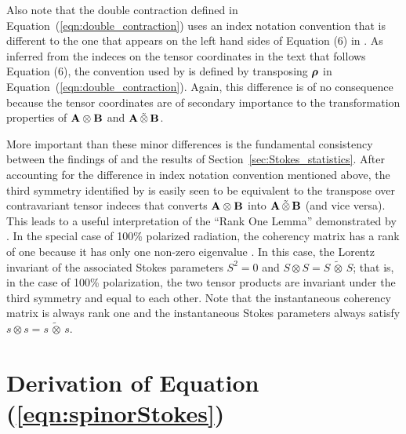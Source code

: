\documentclass[twocolumn]{aastex6}
\newcommand{\mbf}[1]{\mbox{\boldmath $#1$}}
\newcommand{\Eqn}[1]{Equation~(\ref{eqn:#1})}
\newcommand{\Sec}[1]{Section~\ref{sec:#1}}
\newcommand{\outerBilinear}[2]{\ensuremath{{#1}\otimes{#2}}}
\newcommand{\stimes}{\ensuremath{\tilde{\otimes}}}
\newcommand{\spinorBilinear}[2]{\ensuremath{{#1}\,\stimes\,{#2}}}
\begin{document}
{\begin{appendix}
Also note that the double contraction defined in
\Eqn{double_contraction} uses an index notation convention that is
different to the one that appears on the left hand sides of Equation
(6) in \cite{car91}.
%
As inferred from the indeces on the tensor coordinates in the text
that follows Equation (6), the convention used by \cite{car91} is
defined by transposing $\mbf\rho$ in \Eqn{double_contraction}.
%
Again, this difference is of no consequence because the tensor
coordinates are of secondary importance to the transformation
properties of \outerBilinear{\bf A}{\bf B} and \spinorBilinear{\bf
  A}{\bf B}.


More important than these minor differences is the fundamental
consistency between the findings of \cite{car91} and the results of
\Sec{Stokes_statistics}.  After accounting for the difference in index
notation convention mentioned above, the third symmetry identified by
\citet{car91} is easily seen to be equivalent to the transpose over
contravariant tensor indeces that converts \outerBilinear{\bf A}{\bf
  B} into \spinorBilinear{\bf A}{\bf B} (and vice versa).
%
This leads to a useful interpretation of the ``Rank One Lemma''
demonstrated by \citet{car91}.
%
In the special case of 100\% polarized radiation, the coherency matrix
has a rank of one because it has only one non-zero eigenvalue
\citep[e.g.\ Eq.~{[7]} of][and the discussion that follows]{van09}.
%
In this case, the Lorentz invariant of the associated Stokes
parameters $S^2=0$ and $\outerBilinear{S}{S}=\spinorBilinear{S}{S}$;
%
that is, in the case of 100\% polarization, the two tensor products are
invariant under the third symmetry and equal to each other.
%
Note that the instantaneous coherency matrix is always rank one and
the instantaneous Stokes parameters always satisfy
$\outerBilinear{s}{s}=\spinorBilinear{s}{s}$.


\newcommand{\EqnSpinorStokes}{\ref{eqn:spinorStokes}}

\section{Derivation of Equation (\protect\EqnSpinorStokes)}
\label{app:linear_to_Mueller}


\end{appendix}}
\end{document}
